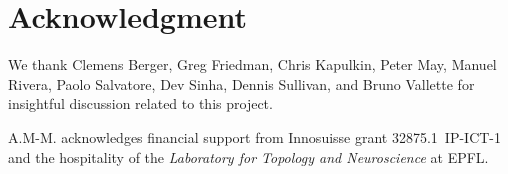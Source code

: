 
\section*{Acknowledgment}

We thank Clemens Berger, Greg Friedman, Chris Kapulkin, Peter May, Manuel Rivera, Paolo Salvatore, Dev Sinha, Dennis Sullivan, and Bruno Vallette for insightful discussion related to this project.

A.M-M. acknowledges financial support from Innosuisse grant 32875.1~IP-ICT-1 and the hospitality of the \textit{Laboratory for Topology and Neuroscience} at EPFL.

